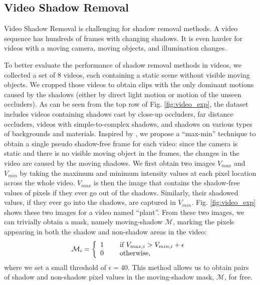 \documentclass[runningheads]{llncs}
\def\mM{\mathcal{M}}
\begin{document}
\subsection{Video Shadow Removal}
\label{sec:dataset}

Video Shadow Removal is challenging for shadow removal methods. A video sequence has hundreds of frames with changing shadows. It is even harder for videos with a moving camera, moving objects, and illumination changes.

To better evaluate the performance of shadow removal methods in videos, we collected a set of 8 videos, each containing a static scene without visible moving objects. We cropped those videos to obtain clips with the only dominant motions caused by the shadows (either by  direct light motion or motion of the unseen occluders). As can be seen from the top row of Fig. \ref{fig:video_exp}, the dataset includes videos containing shadows cast by close-up occluders, far distance occluders, videos with simple-to-complex shadows, and shadows on various types of backgrounds and materials. Inspired by \cite{Chuang2003}, we propose a ``max-min'' technique to obtain a single pseudo shadow-free frame for each video: since the camera is static and there is no visible moving object in the frames, the changes in the video are caused by the moving shadows. We first obtain two images $V_{max}$ and $V_{min}$ by taking the maximum and minimum intensity values at each pixel location across the whole video. $V_{max}$ is then the image that contains the shadow-free values of pixels if they ever go out of the shadows. Similarly, their shadowed values, if they ever go into the shadows, are captured in $V_{min}$. Fig. \ref{fig:video_exp} shows these two images for a video named ``plant''. From these two images, we can trivially obtain a mask, namely moving-shadow $\mM$, marking the pixels appearing in both the shadow and non-shadow areas in the video: 
\begin{align}
	\mM_{i} = \left\{ 
	\begin{array}{ll}
		1 & \hspace{3ex}\textrm{if } V_{max,i}  > V_{min,i}  + \epsilon \\
		0 & \hspace{3ex}\textrm{otherwise},
	\end{array}
	\right. 
\end{align}
where we set a small threshold of $\epsilon=40$.  This method allows us to obtain pairs of shadow and non-shadow pixel values in the moving-shadow mask, $\mM$, for free.
\end{document}
